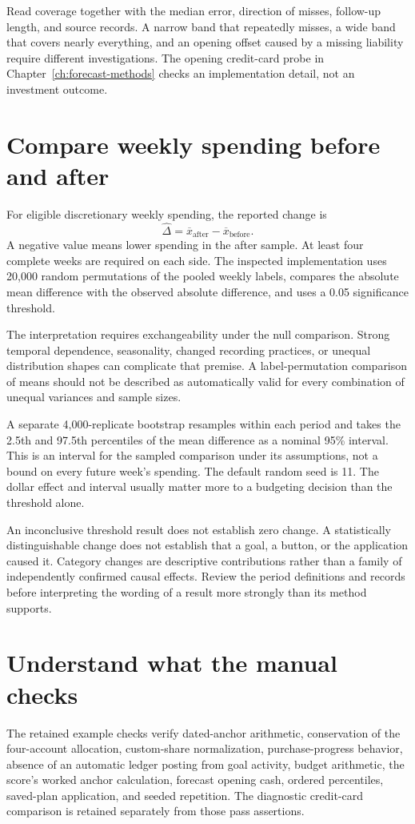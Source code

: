 Read coverage together with the median error, direction of misses, follow-up length, and source records. A narrow band that repeatedly misses, a wide band that covers nearly everything, and an opening offset caused by a missing liability require different investigations. The opening credit-card probe in Chapter~\ref{ch:forecast-methods} checks an implementation detail, not an investment outcome.

\section{Compare weekly spending before and after}
For eligible discretionary weekly spending, the reported change is
\[
 \widehat{\Delta}=\overline{x}_{\mathrm{after}}-
 \overline{x}_{\mathrm{before}}.
\]
A negative value means lower spending in the after sample. At least four complete weeks are required on each side. The inspected implementation uses 20,000 random permutations of the pooled weekly labels, compares the absolute mean difference with the observed absolute difference, and uses a 0.05 significance threshold.

The interpretation requires exchangeability under the null comparison. Strong temporal dependence, seasonality, changed recording practices, or unequal distribution shapes can complicate that premise. A label-permutation comparison of means should not be described as automatically valid for every combination of unequal variances and sample sizes.

A separate 4,000-replicate bootstrap resamples within each period and takes the 2.5th and 97.5th percentiles of the mean difference as a nominal 95\% interval. This is an interval for the sampled comparison under its assumptions, not a bound on every future week's spending. The default random seed is 11. The dollar effect and interval usually matter more to a budgeting decision than the threshold alone.

An inconclusive threshold result does not establish zero change. A statistically distinguishable change does not establish that a goal, a button, or the application caused it. Category changes are descriptive contributions rather than a family of independently confirmed causal effects. Review the period definitions and records before interpreting the wording of a result more strongly than its method supports.

\section{Understand what the manual checks}
The retained example checks verify dated-anchor arithmetic, conservation of the four-account allocation, custom-share normalization, purchase-progress behavior, absence of an automatic ledger posting from goal activity, budget arithmetic, the score's worked anchor calculation, forecast opening cash, ordered percentiles, saved-plan application, and seeded repetition. The diagnostic credit-card comparison is retained separately from those pass assertions.

